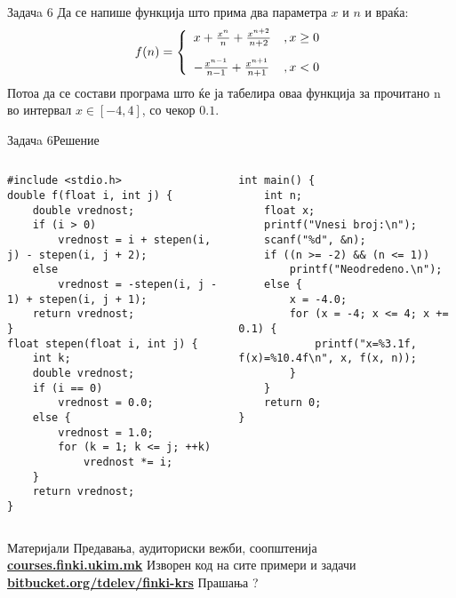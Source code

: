 \begin{frame}{Задачa 6}
Да се напише функција што прима два параметра $x$ и $n$ и враќа:
\[
   f(n) = \left\{ 
  \begin{array}{l l}
    x + \frac{x^n}{n} + \frac{x^{n+2}}{n + 2} &,x\geq0\\[10px]
    - \frac{x^{n - 1}}{n - 1} + \frac{x^{n+1}}{n + 1} &,x<0
  \end{array} \right.
\]
Потоа да се состави програма што ќе ја табелира оваа функција за прочитано n во
интервал $x\in[-4, 4]$, со чекор $0.1$.
\end{frame}

\begin{frame}[fragile]{Задачa 6}{Решение}
\begin{columns}
    \begin{lstlisting}
#include <stdio.h>
double f(float i, int j) {
    double vrednost;
    if (i > 0)
        vrednost = i + stepen(i, j) - stepen(i, j + 2);
    else
        vrednost = -stepen(i, j - 1) + stepen(i, j + 1);
    return vrednost;
}
float stepen(float i, int j) {
    int k;
    double vrednost;
    if (i == 0)
        vrednost = 0.0;
    else {
        vrednost = 1.0;
        for (k = 1; k <= j; ++k)
            vrednost *= i;
    }
    return vrednost;
}
\end{lstlisting}
\begin{lstlisting}
int main() {
    int n;
    float x;
    printf("Vnesi broj:\n");
    scanf("%d", &n);
    if ((n >= -2) && (n <= 1))
        printf("Neodredeno.\n");
    else {
        x = -4.0;
        for (x = -4; x <= 4; x += 0.1) {
            printf("x=%3.1f, f(x)=%10.4f\n", x, f(x, n));
        }
    }
    return 0;
}
\end{lstlisting}
\end{columns}
\end{frame}



\begin{frame}{Материјали}{}
	Предавања, аудиториски вежби, соопштенија\\
	\href{http://courses.finki.ukim.mk/}{\textbf{courses.finki.ukim.mk}}
	\vfill
	Изворен код на сите примери и задачи\\
	\href{http://bitbucket.org/tdelev/finki-krs/}{\textbf{bitbucket.org/tdelev/finki-krs}}
	\vfill
	{\Huge Прашања ?}
\end{frame}


